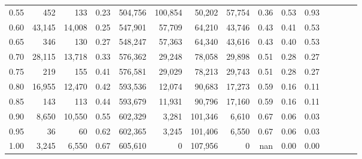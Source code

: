 \begin{tabular}{rrrcrrrrrrrrrrr}
0.55 &     452 &     133 &                                       0.23 &  504,756 &  100,854 &   50,202 &   57,754 &  0.36 &  0.53 &                         0.93 \\
0.60 &  43,145 &  14,008 &                                       0.25 &  547,901 &   57,709 &   64,210 &   43,746 &  0.43 &  0.41 &                         0.53 \\
0.65 &     346 &     130 &                                       0.27 &  548,247 &   57,363 &   64,340 &   43,616 &  0.43 &  0.40 &                         0.53 \\
0.70 &  28,115 &  13,718 &                                       0.33 &  576,362 &   29,248 &   78,058 &   29,898 &  0.51 &  0.28 &                         0.27 \\
0.75 &     219 &     155 &                                       0.41 &  576,581 &   29,029 &   78,213 &   29,743 &  0.51 &  0.28 &                         0.27 \\
0.80 &  16,955 &  12,470 &                                       0.42 &  593,536 &   12,074 &   90,683 &   17,273 &  0.59 &  0.16 &                         0.11 \\
0.85 &     143 &     113 &                                       0.44 &  593,679 &   11,931 &   90,796 &   17,160 &  0.59 &  0.16 &                         0.11 \\
0.90 &   8,650 &  10,550 &                                       0.55 &  602,329 &    3,281 &  101,346 &    6,610 &  0.67 &  0.06 &                         0.03 \\
0.95 &      36 &      60 &                                       0.62 &  602,365 &    3,245 &  101,406 &    6,550 &  0.67 &  0.06 &                         0.03 \\
1.00 &   3,245 &   6,550 &                                       0.67 &  605,610 &        0 &  107,956 &        0 &   nan &  0.00 &                         0.00 \\
\bottomrule
\end{tabular}
